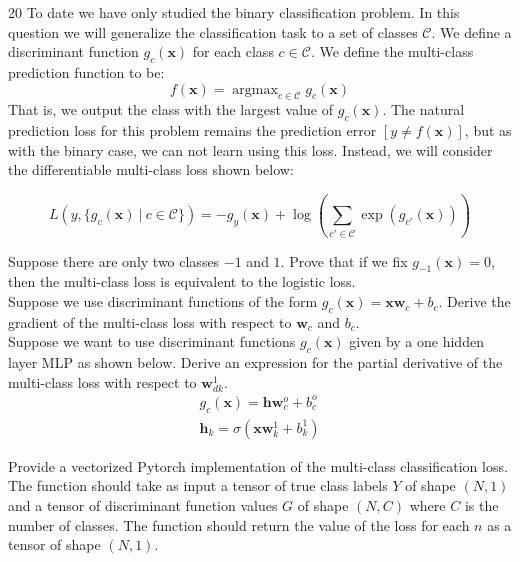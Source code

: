 \documentclass[11pt]{article}
\newcommand{\argmax}{\mathop{\arg\max}}
\newcommand{\mbf}[1]{{\mathbf{#1}}}
\begin{document}
\begin{problem}{20}
    To date we have only studied the binary classification problem. In this question we will generalize the classification task to a set of classes $\mathcal{C}$. We define a discriminant function $g_c(\mbf{x})$ for each class $c\in\mathcal{C}$. We define the multi-class prediction function to be: $$f(\mbf{x}) = \argmax_{c\in\mathcal{C}} g_c(\mbf{x})$$ That is, we output the class with the largest value of $g_c(\mbf{x})$. The natural prediction loss for this problem remains the prediction error $[y\neq f(\mbf{x})]$, but as with the binary case, we can not learn using this loss. Instead, we will consider the differentiable multi-class loss shown below: 

    $$L(y,\{g_c(\mbf{x})~|~c\in\mathcal{C}\}) = -g_y(\mbf{x}) + \log(\sum_{c'\in\mathcal{C}} \exp(  g_{c'}(\mbf{x})))$$

     Suppose there are only two classes $-1$ and $1$. Prove that if we fix $g_{-1}(\mbf{x})=0$, then the multi-class loss is equivalent to the logistic loss.\\
    
     Suppose we use discriminant functions of the form  $g_c(\mbf{x})= \mbf{x}\mbf{w}_c + b_c$. Derive the gradient of the multi-class loss with respect to $\mbf{w}_c$ and $b_c$.\\

     Suppose we want to use discriminant functions $g_c(\mbf{x})$ given by a one hidden layer MLP as shown below. Derive an expression for the partial derivative of the multi-class loss with respect to $\mbf{w}_{dk}^1$. 
%
    \begin{align*}
        g_c(\mbf{x}) = \mbf{h}\mbf{w}^o_c + b^o_c\\
        \mbf{h}_k    = \sigma(\mbf{x}\mbf{w}^1_k+b^1_k)
    \end{align*}
    
     Provide a vectorized Pytorch implementation of the multi-class classification loss. The function should take as input a tensor of true class labels $Y$ of shape $(N,1)$ and a tensor of discriminant function values $G$ of shape $(N,C)$ where $C$ is the number of classes. The function should return the value of the loss for each $n$ as a tensor of shape $(N,1)$.

\end{problem}
\end{document}
